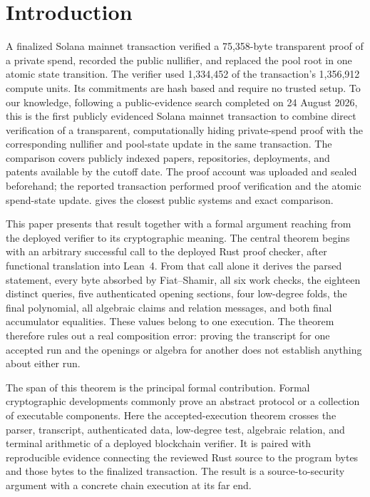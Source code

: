 \section{Introduction}
\label{sec:introduction}

A finalized Solana mainnet transaction verified a 75,358-byte transparent
proof of a private spend, recorded the public nullifier, and replaced the pool
root in one atomic state transition.  The verifier used 1,334,452 of the
transaction's 1,356,912 compute units.  Its commitments are hash based and
require no trusted setup.  To our knowledge, following a public-evidence
search completed on 24 August 2026, this is the first publicly evidenced
Solana mainnet transaction to combine direct verification of a transparent,
computationally hiding private-spend proof with the corresponding nullifier
and pool-state update in the same transaction.  The comparison covers publicly
indexed papers, repositories, deployments, and patents available by the cutoff
date.  The proof account was uploaded and sealed beforehand; the reported
transaction performed proof verification and the atomic spend-state update.
 gives the closest public systems and exact comparison.

This paper presents that result together with a formal argument reaching from
the deployed verifier to its cryptographic meaning.  The central theorem
begins with an arbitrary successful call to the deployed Rust proof checker,
after functional translation into Lean~4.  From that call alone it derives
the parsed statement, every byte absorbed by Fiat--Shamir, all six work
checks, the eighteen distinct queries, five authenticated opening sections,
four low-degree folds, the final polynomial, all algebraic claims and relation
messages, and both final accumulator equalities.  These values belong to one
execution.  The theorem therefore rules out a real composition error: proving
the transcript for one accepted run and the openings or algebra for another
does not establish anything about either run.

The span of this theorem is the principal formal contribution.  Formal
cryptographic developments commonly prove an abstract protocol or a
collection of executable components.  Here the accepted-execution theorem
crosses the parser, transcript, authenticated data, low-degree test, algebraic
relation, and terminal arithmetic of a deployed blockchain verifier.  It is
paired with reproducible evidence connecting the reviewed Rust source to the
program bytes and those bytes to the finalized transaction.  The result is a
source-to-security argument with a concrete chain execution at its far end.

